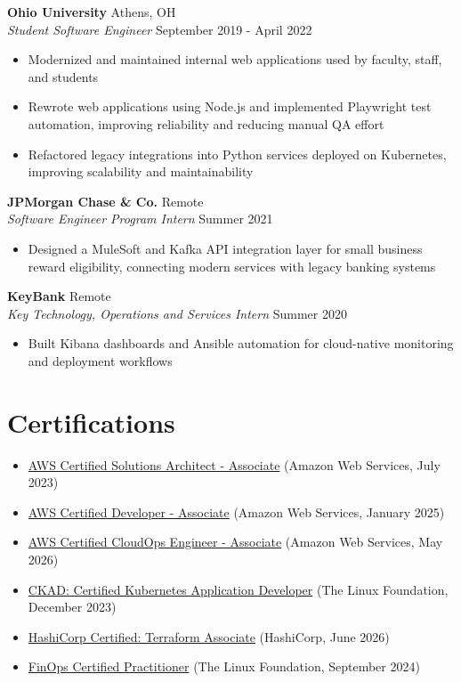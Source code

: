 \documentclass[11pt,a4paper]{article}
\newcommand{\sectionspace}{\vspace{0.8mm}}
\begin{document}
\noindent \textbf{Ohio University} \hfill Athens, OH\\
\textit{Student Software Engineer} \hfill September 2019 - April 2022
\begin{itemize}
	\item Modernized and maintained internal web applications used by faculty, staff, and students
	\item Rewrote web applications using Node.js and implemented Playwright test automation, improving reliability and reducing manual QA effort
	\item Refactored legacy integrations into Python services deployed on Kubernetes, improving scalability and maintainability
\end{itemize}

\noindent \textbf{JPMorgan Chase \& Co.} \hfill Remote\\
\textit{Software Engineer Program Intern} \hfill Summer 2021
\begin{itemize}
	\item Designed a MuleSoft and Kafka API integration layer for small business reward eligibility, connecting modern services with legacy banking systems
\end{itemize}

\noindent \textbf{KeyBank} \hfill Remote\\
\textit{Key Technology, Operations and Services Intern} \hfill Summer 2020
\begin{itemize}
	\item Built Kibana dashboards and Ansible automation for cloud-native monitoring and deployment workflows
\end{itemize}

\section{Certifications}
\sectionspace
\begin{itemize}[itemsep=-2pt]
	\item \href{https://www.credly.com/badges/30354133-56e3-40c4-b1d9-67dad6ab2463/public_url}{AWS Certified Solutions Architect - Associate} (Amazon Web Services, July 2023)
	\item \href{https://www.credly.com/badges/38390b39-c573-4cec-b15e-7883aef5701b/public_url}{AWS Certified Developer - Associate} (Amazon Web Services, January 2025)
	\item \href{https://www.credly.com/badges/ab16d41a-4e00-425a-b495-3604a89430d6/public_url}{AWS Certified CloudOps Engineer - Associate} (Amazon Web Services, May 2026)
	\item \href{https://www.credly.com/badges/df9b85f0-efc1-44fa-bac0-ded529c613cc/public_url}{CKAD: Certified Kubernetes Application Developer} (The Linux Foundation, December 2023)
	\item \href{https://www.credly.com/badges/0b7cc660-d894-46c5-8ef1-ee8a28dbf33a/public_url}{HashiCorp Certified: Terraform Associate} (HashiCorp, June 2026)
	\item \href{https://www.credly.com/badges/706bbe29-8d02-48d7-9ee8-c639ff43458c/public_url}{FinOps Certified Practitioner} (The Linux Foundation, September 2024)
\end{itemize}
\end{document}
